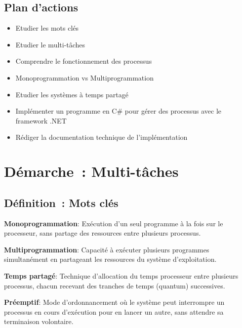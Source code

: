 \subsection*{Plan d'actions}
{}
\begin{itemize}
	\item Etudier les mots clés
	\item Etudier le multi-tâches
	\item Comprendre le fonctionnement des processus
	\item Monoprogrammation vs Multiprogrammation
	\item Etudier les systèmes à temps partagé
	\item Implémenter un programme en C\# pour gérer des processus avec le framework .NET
	\item Rédiger la documentation technique de l'implémentation
\end{itemize}

\newpage
\section*{Démarche~: Multi-tâches}


\subsection*{Définition~: Mots clés}
{}

\noindent \textbf{Monoprogrammation}: Exécution d'un seul programme à la fois sur le processeur, sans partage des ressources entre plusieurs processus.

\vspace{0.5cm}

\noindent \textbf{Multiprogrammation}: Capacité à exécuter plusieurs programmes simultanément en partageant les ressources du système d'exploitation.

\vspace{0.5cm}

\noindent \textbf{Temps partagé}: Technique d'allocation du temps processeur entre plusieurs processus, chacun recevant des tranches de temps (quantum) successives.

\vspace{0.5cm}

\noindent \textbf{Préemptif}: Mode d'ordonnancement où le système peut interrompre un processus en cours d'exécution pour en lancer un autre, sans attendre sa terminaison volontaire.

